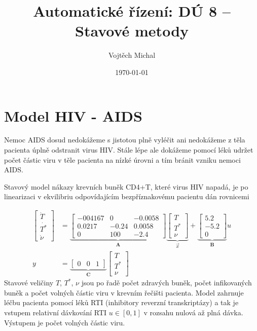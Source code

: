 \documentclass[twoside]{article}
\title{Automatické řízení: DÚ 8 -- Stavové metody}
\author{Vojtěch Michal}
\date{\today}
\begin{document}
\maketitle

\section{Model HIV - AIDS}
Nemoc AIDS dosud nedokážeme s jistotou plně vyléčit ani nedokážeme z těla pacienta úplně odstranit virus
HIV. Stále lépe ale dokážeme pomocí léků udržet počet částic viru v těle pacienta na nízké úrovni a tím
bránit vzniku nemoci AIDS.

Stavový model nákazy krevních buněk CD4+T, které virus HIV napadá, je po linearizaci v ekvilibriu
odpovídajícím bezpříznakovému pacientu dán rovnicemi

\begin{equation}
	\begin{split}
		\begin{bmatrix}
			\dot{T} \\
			\dot{T^{*}} \\
			\dot{\nu}
		\end{bmatrix} &= \underbrace{\begin{bmatrix}
			-004167 & 0 & -0.0058 \\
			0.0217 & -0.24 & 0.0058 \\
			0 & 100 & -2.4
		\end{bmatrix}}_{\mathbf{A}} \underbrace{\begin{bmatrix}
		T \\
		T^{*} \\
		\nu
	\end{bmatrix}}_{ \vec{x}} + \underbrace{\begin{bmatrix}
		5.2 \\
		-5.2 \\
		0
	\end{bmatrix}}_{\mathbf{B}} u \\
	y &= \underbrace{\begin{bmatrix}
		0 & 0 & 1
	\end{bmatrix}}_{\mathbf{C}} \begin{bmatrix}
		T \\
		T^{*} \\
		\nu
	\end{bmatrix}
\end{split}
\label{eq:zadani}
\end{equation}
Stavové veličiny $T$, $T^{*}$, $\nu$ jsou po řadě počet zdravých buněk, počet infikovaných buněk a počet volných
částic viru v krevním řečišti pacienta. Model zahrnuje léčbu pacienta pomocí léků RTI (inhibitory reverzní
transkriptázy) a tak je vstupem relativní dávkování RTI  $u \in [0,1]$ v rozsahu nulová až plná dávka. Výstupem
je počet volných částic viru.
\end{document}
